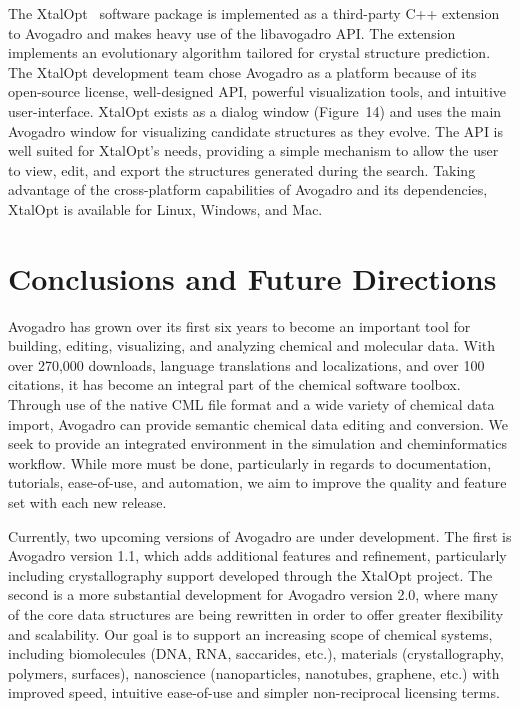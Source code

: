 \documentclass[10pt]{bmc_article}
\newenvironment{bmcformat}{\begin{raggedright}
  \baselineskip20pt\sloppy\setboolean{publ}{false}}{\end{raggedright}
  \baselineskip20pt\sloppy}
\begin{document}
\begin{bmcformat}
The XtalOpt~\cite{xo1, xo2} software package is implemented as a third-party C++
extension to Avogadro and makes heavy use of the libavogadro API. The extension
implements an evolutionary algorithm tailored for crystal structure prediction.
The XtalOpt development team chose Avogadro as a platform because of its
open-source license, well-designed API, powerful visualization tools, and
intuitive user-interface. XtalOpt exists as a dialog window
(Figure~14) and uses the main Avogadro window for visualizing
candidate structures as they evolve. The API is well suited for XtalOpt’s needs,
providing a simple mechanism to allow the user to view, edit, and export the
structures generated during the search. Taking advantage of the cross-platform
capabilities of Avogadro and its dependencies, XtalOpt is available for Linux,
Windows, and Mac.

\section*{Conclusions and Future Directions}

Avogadro has grown over its first six years to become an important
tool for building, editing, visualizing, and analyzing chemical and
molecular data. With over 270,000 downloads,
language translations and localizations, and over 100 citations, it
has become an integral part of the chemical software toolbox. Through
use of the native CML file format and a wide variety of chemical data
import, Avogadro can provide semantic chemical data editing and conversion.
We seek to provide an integrated environment in the simulation and
cheminformatics workflow. While more must be done, particularly in
regards to documentation, tutorials, ease-of-use, and automation, we
aim to improve the quality and feature set with each new release.

Currently, two upcoming versions of Avogadro are under development. The
first is Avogadro version 1.1, which adds additional features and
refinement, particularly including crystallography support developed
through the XtalOpt project. The second is a more substantial
development for Avogadro version 2.0, where many of the core data
structures are being rewritten in order to offer greater flexibility and
scalability. Our goal is to support an increasing scope of chemical
systems, including biomolecules (DNA, RNA, saccarides, etc.),
materials (crystallography, polymers, surfaces), nanoscience
(nanoparticles, nanotubes, graphene, etc.) with improved speed, intuitive
ease-of-use and simpler non-reciprocal licensing terms.


\end{bmcformat}
\end{document}

